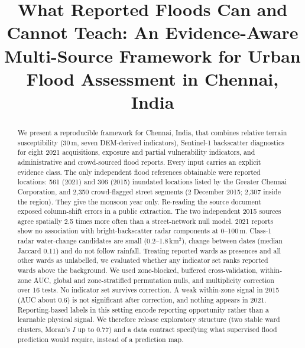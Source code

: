 \documentclass[conference]{IEEEtran}
\begin{document}
\title{What Reported Floods Can and Cannot Teach: An Evidence-Aware Multi-Source Framework for Urban Flood Assessment in Chennai, India}

\author{\IEEEauthorblockN{[Author 1]\quad [Author 2]}
\and
\IEEEauthorblockN{[Supervisor]}
\IEEEauthorblockA{[Department], [Institution]}}

\maketitle

\begin{abstract}
We present a reproducible framework for Chennai, India, that combines relative terrain susceptibility (30\,m, seven DEM-derived indicators), Sentinel-1 backscatter diagnostics for eight 2021 acquisitions, exposure and partial vulnerability indicators, and administrative and crowd-sourced flood reports. Every input carries an explicit evidence class. The only independent flood references obtainable were reported locations: 561 (2021) and 306 (2015) inundated locations listed by the Greater Chennai Corporation, and 2{,}350 crowd-flagged street segments (2 December 2015; 2{,}307 inside the region). They give the monsoon year only. Re-reading the source document exposed column-shift errors in a public extraction. The two independent 2015 sources agree spatially 2.5 times more often than a street-network null model. 2021 reports show no association with bright-backscatter radar components at 0--100\,m. Class-1 radar water-change candidates are small (0.2--1.8\,km$^2$), change between dates (median Jaccard 0.11) and do not follow rainfall. Treating reported wards as presences and all other wards as unlabelled, we evaluated whether any indicator set ranks reported wards above the background. We used zone-blocked, buffered cross-validation, within-zone AUC, global and zone-stratified permutation nulls, and multiplicity correction over 16 tests. No indicator set survives correction. A weak within-zone signal in 2015 (AUC about 0.6) is not significant after correction, and nothing appears in 2021. Reporting-based labels in this setting encode reporting opportunity rather than a learnable physical signal. We therefore release exploratory structure (two stable ward clusters, Moran's $I$ up to 0.77) and a data contract specifying what supervised flood prediction would require, instead of a prediction map.
\end{abstract}
\end{document}
